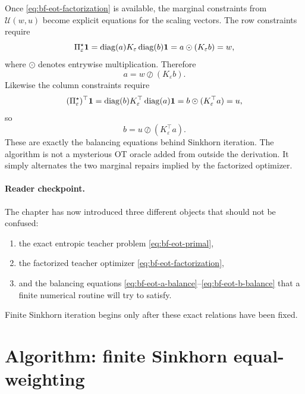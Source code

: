 Once \eqref{eq:bf-eot-factorization} is available, the marginal constraints from
\(\mathcal U(w,u)\) become explicit equations for the scaling vectors.  The row
constraints require
\begin{equation}
\label{eq:bf-eot-row-balance-derived}
  \Pi_\varepsilon^\star\mathbf 1
  =
  \operatorname{diag}(a)K_\varepsilon\operatorname{diag}(b)\mathbf 1
  =
  a \odot (K_\varepsilon b)
  = w,
\end{equation}
where \(\odot\) denotes entrywise multiplication.  Therefore
\begin{equation}
\label{eq:bf-eot-a-balance}
  a = w \oslash (K_\varepsilon b).
\end{equation}
Likewise the column constraints require
\begin{equation}
\label{eq:bf-eot-col-balance-derived}
  (\Pi_\varepsilon^\star)^\top\mathbf 1
  =
  \operatorname{diag}(b)K_\varepsilon^\top\operatorname{diag}(a)\mathbf 1
  =
  b \odot (K_\varepsilon^\top a)
  = u,
\end{equation}
so
\begin{equation}
\label{eq:bf-eot-b-balance}
  b = u \oslash (K_\varepsilon^\top a).
\end{equation}
These are exactly the balancing equations behind Sinkhorn iteration.  The algorithm
is not a mysterious OT oracle added from outside the derivation.  It simply
alternates the two marginal repairs implied by the factorized optimizer.

\paragraph{Reader checkpoint.}
The chapter has now introduced three different objects that should not be
confused:
\begin{enumerate}[label=(\roman*)]
  \item the exact entropic teacher problem \eqref{eq:bf-eot-primal},
  \item the factorized teacher optimizer \eqref{eq:bf-eot-factorization},
  \item and the balancing equations \eqref{eq:bf-eot-a-balance}--\eqref{eq:bf-eot-b-balance}
  that a finite numerical routine will try to satisfy.
\end{enumerate}
Finite Sinkhorn iteration begins only after these exact relations have been fixed.

\section{Algorithm: finite Sinkhorn equal-weighting}
\label{sec:bf-eot-algorithm}

